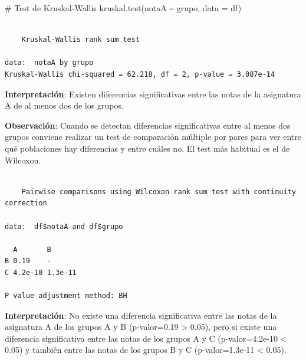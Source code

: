 \documentclass[
  a4paper,
]{scrreport}
\newenvironment{Shaded}{\begin{snugshade}}{\end{snugshade}}
\newcommand{\AttributeTok}[1]{\textcolor[rgb]{0.40,0.45,0.13}{#1}}
\newcommand{\CommentTok}[1]{\textcolor[rgb]{0.37,0.37,0.37}{#1}}
\newcommand{\FunctionTok}[1]{\textcolor[rgb]{0.28,0.35,0.67}{#1}}
\newcommand{\NormalTok}[1]{\textcolor[rgb]{0.00,0.23,0.31}{#1}}
\newcommand{\SpecialCharTok}[1]{\textcolor[rgb]{0.37,0.37,0.37}{#1}}
\newcommand{\StringTok}[1]{\textcolor[rgb]{0.13,0.47,0.30}{#1}}
\theoremstyle{definition}
\theoremstyle{definition}
\theoremstyle{remark}
\begin{document}
\begin{Shaded}
\begin{Highlighting}[]
\CommentTok{\# Test de Kruskal{-}Wallis}
\FunctionTok{kruskal.test}\NormalTok{(notaA }\SpecialCharTok{\textasciitilde{}}\NormalTok{ grupo, }\AttributeTok{data =}\NormalTok{ df)}
\end{Highlighting}
\end{Shaded}

\begin{verbatim}

    Kruskal-Wallis rank sum test

data:  notaA by grupo
Kruskal-Wallis chi-squared = 62.218, df = 2, p-value = 3.087e-14
\end{verbatim}

\textbf{Interpretación}: Existen diferencias significativas entre las
notas de la asignatura A de al menos dos de los grupos.

\textbf{Observación}: Cuando se detectan diferencias significativas
entre al menos dos grupos conviene realizar un test de comparación
múltiple por pares para ver entre qué poblaciones hay diferencias y
entre cuáles no. El test más habitual es el de Wilcoxon.

\begin{Shaded}
\end{Shaded}

\begin{verbatim}

    Pairwise comparisons using Wilcoxon rank sum test with continuity correction 

data:  df$notaA and df$grupo 

  A       B      
B 0.19    -      
C 4.2e-10 1.3e-11

P value adjustment method: BH 
\end{verbatim}

\textbf{Interpretación}: No existe una diferencia significativa entre
las notas de la asignatura A de los grupos A y B (p-valor=0.19
\textgreater{} 0.05), pero si existe una diferencia significativa entre
las notas de los grupos A y C (p-valor=4.2e-10 \textless{} 0.05) y
también entre las notas de los grupos B y C (p-valor=1.3e-11 \textless{}
0.05).
\end{document}
